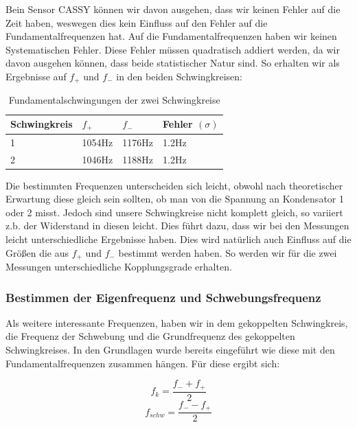 \documentclass[twoside]{protokoll}
\begin{document}
Bein Sensor CASSY können wir davon ausgehen, dass wir keinen Fehler auf die Zeit haben, weswegen dies kein Einfluss auf den Fehler auf die Fundamentalfrequenzen hat.
Auf die Fundamentalfrequenzen haben wir keinen Systematischen Fehler.
Diese Fehler müssen quadratisch addiert werden, da wir davon ausgehen können, dass beide statistischer Natur sind.
So erhalten wir als Ergebnisse auf $ f_+$ und $ f_-$ in den beiden Schwingkreisen:

\begin{table}[H]
    \centering
    \begin{tabularx}{1\textwidth}{X X X X} %
        \toprule
        \textbf{Schwingkreis} & \textbf{$f_+$ } & \textbf{$f_-$ } & \textbf{Fehler $(\sigma)$}\\
        \midrule
        1 & 1054Hz & 1176Hz & 1.2Hz\\
        2 & 1046Hz & 1188Hz & 1.2Hz\\
        \bottomrule
    \end{tabularx}
    \caption{Fundamentalschwingungen der zwei Schwingkreise}
    \label{•}
\end{table}

Die bestimmten Frequenzen unterscheiden sich leicht, obwohl nach theoretischer Erwartung diese gleich sein sollten, ob man von die Spannung an Kondensator 1 oder 2 misst.
Jedoch sind unsere Schwingkreise nicht komplett gleich, so variiert z.b. der Widerstand in diesen leicht. Dies führt dazu, dass wir bei den Messungen leicht unterschiedliche Ergebnisse haben. 
Dies wird natürlich auch Einfluss auf die Größen die aus $f_+$ und $f_-$ bestimmt werden haben. So werden wir für die zwei Messungen unterschiedliche Kopplungsgrade erhalten.

\subsubsection{Bestimmen der Eigenfrequenz und Schwebungsfrequenz}


Als weitere interessante Frequenzen, haben wir in dem gekoppelten Schwingkreis, die Frequenz der Schwebung und die Grundfrequenz des gekoppelten Schwingkreises. 
In den Grundlagen wurde bereits eingeführt wie diese mit den Fundamentalfrequenzen zusammen hängen.
Für diese ergibt sich:

\begin{equation}
    f_k = \frac{f_- + f_+}{2}
\end{equation}
\begin{equation}
    f_{schw} = \frac{f_- - f_+}{2}
\end{equation}
\end{document}
